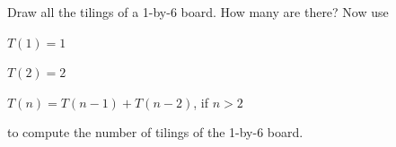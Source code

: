Draw all the tilings of a 1-by-6 board. How many are there? Now use



$T(1) = 1$



$T(2) = 2$



$T(n) = T(n - 1) + T(n - 2)$, if $n > 2$



to compute the number of tilings of the 1-by-6 board.

